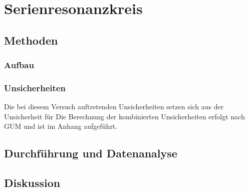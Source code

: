 \section{Serienresonanzkreis} 

\subsection{Methoden}

\subsubsection{Aufbau}


\subsubsection{Unsicherheiten} 

Die bei diesem Versuch auftretenden Unsicherheiten setzen sich aus der Unsicherheit für %
Die Berechnung der kombinierten Unsicherheiten erfolgt nach GUM und ist im Anhang aufgeführt.

\subsection{Durchführung und Datenanalyse}


\subsection{Diskussion}


